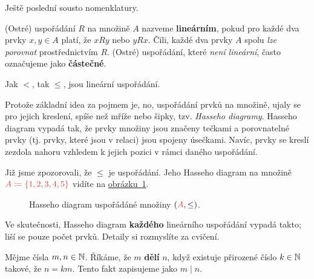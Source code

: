 Ještě poslední sousto nomenklatury.

\begin{definition}
 (Ostré) uspořádání $R$ na množině $A$ nazveme \textbf{lineárním}, pokud pro každé dva
 prvky $x,y \in A$ platí, že $xRy$ nebo $yRx$. Čili, každé dva prvky $A$ spolu
 \emph{lze porovnat} prostřednictvím $R$. (Ostré) uspořádání, které \emph{není
 lineární}, často označujeme jako \textbf{částečné}.
\end{definition}

\begin{example}
 Jak $<$, tak $ \leq $, jsou lineární uspořádání.
\end{example}

Protože základní idea za pojmem  je, no, uspořádání prvků na
množině, ujaly se pro jejich kreslení, spíše než mříže nebo šipky, tzv.
\emph{Hasseho diagramy}. Hasseho diagram vypadá tak, že prvky množiny jsou
značeny tečkami a porovnatelné prvky (tj. prvky, které jsou v relaci) jsou
spojeny úsečkami. Navíc, prvky se kreslí zezdola nahoru vzhledem k jejich pozici
v rámci daného uspořádání.

\begin{example}
 Již jsme zpozorovali, že $ \leq $ je uspořádání. Jeho Hasseho diagram na
 množině $\clr{A \coloneqq \{1,2,3,4,5\}}$ vidíte na
 \hyperref[fig:hasse-linear]{obrázku~\ref*{fig:hasse-linear}}.
 \begin{figure}[H]
  \centering
  \caption{Hasseho diagram uspořádáné množiny $(\clr{A}, \leq)$.}
  \label{fig:hasse-linear}
 \end{figure}
 Ve skutečnosti, Hasseho diagram \textbf{každého} lineárního uspořádání vypadá
 takto; liší se pouze počet prvků. Detaily si rozmyslíte za cvičení.
\end{example}

\begin{definition}[Dělitelnost]
 \label{def:delitelnost}
 Mějme čísla $m,n \in \mathbb{N}$. Říkáme, že $m$ \textbf{dělí} $n$, když existuje
 přirozené číslo $k \in \mathbb{N}$ takové, že $n = km$. Tento fakt zapisujeme jako $m
 \mid n$.
\end{definition}

